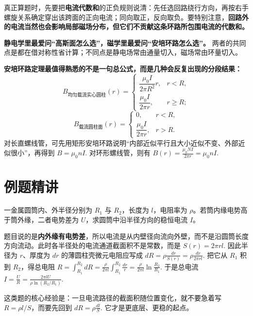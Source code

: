 \documentclass[lang=cn,11pt]{elegantbook}
\begin{document}
\begin{remark}
真正算题时，先要把\textbf{电流代数和}的正负规则说清：先任选回路绕行方向，再按右手螺旋关系确定穿出该跨面的正向电流；同向取正，反向取负。要特别注意，\textbf{回路外的电流当然也会影响局部磁场分布，但它们不贡献这条环路所包围电流的代数和。}
\end{remark}

\begin{note}
\textbf{静电学里最爱问“高斯面怎么选”，磁学里最爱问“安培环路怎么选”。} 两者的共同点是都在借对称性省计算；不同点是静电场常由通量切入，磁场常由环量切入。
\end{note}

\begin{remark}
\textbf{安培环路定理最值得熟悉的不是一句总公式，而是几种会反复出现的分段结果：}
\[
B_{\text{均匀载流实心圆柱}}(r)=
\begin{cases}
\dfrac{\mu_0 I}{2\pi R^2}r, & r<R,\\[4pt]
\dfrac{\mu_0 I}{2\pi r}, & r\ge R;
\end{cases}
\]
\[
B_{\text{载流圆柱面}}(r)=
\begin{cases}
0, & r<R,\\[4pt]
\dfrac{\mu_0 I}{2\pi r}, & r>R.
\end{cases}
\]
对长直螺线管，可先用矩形安培环路说明“内部近似平行且大小近似不变、外部近似很小”，再得到
 \(B=\mu_0 nI.\) 
对环形螺线管，则有
 \(B(r)=\frac{\mu_0 NI}{2\pi r}=\mu_0 nI.\) 
\end{remark}

\section{例题精讲}

\begin{exercise}[径向导电圆筒的总电流]
一金属圆筒内、外半径分别为 \(R_1\) 与 \(R_2\)，长度为 \(l\)，电阻率为 \(\rho\)。若筒内缘电势高于筒外缘，二者电势差为 \(U\)，求圆筒中沿半径方向的稳恒电流 \(I\)。
\end{exercise}

\begin{solution}
题目说的是\textbf{内外缘有电势差}，所以电流是从内壁径向流向外壁，而不是沿圆筒长度方向流动。此时各半径处的电流通道截面积不是常数，而是
 \(S(r)=2\pi rl.\) 
因此半径为 \(r\)、厚度为 \(dr\) 的薄圆柱壳微元电阻应写成
 \(dR=\rho\frac{dr}{S(r)}=\rho\frac{dr}{2\pi rl}.\) 
把它从 \(R_1\) 积到 \(R_2\)，得总电阻
 \(R=\int_{R_1}^{R_2} dR =\frac{\rho}{2\pi l}\int_{R_1}^{R_2}\frac{dr}{r} =\frac{\rho}{2\pi l}\ln\frac{R_2}{R_1}.\) 
于是总电流
 \(I=\frac{U}{R} =\frac{2\pi lU}{\rho\ln(R_2/R_1)}.\) 

这类题的核心经验是：一旦电流路径的截面积随位置变化，就不要急着写 \(R=\rho l/S\)，而要先回到
 \(dR=\rho\frac{dl}{S}.\) 
它才是更底层、更稳的起点。
\end{solution}
\end{document}
